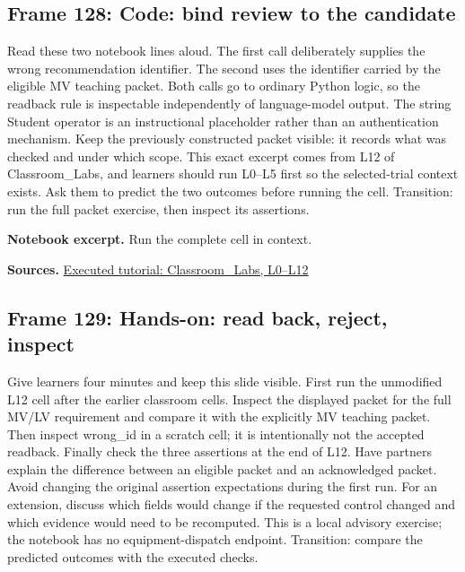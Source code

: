 \documentclass[11pt]{article}
\newcommand{\Code}[1]{}
\begin{document}
\subsection*{Frame 128: Code: bind review to the candidate}
Read these two notebook lines aloud. The first call deliberately supplies the wrong recommendation identifier. The second uses the identifier carried by the eligible MV teaching packet. Both calls go to ordinary Python logic, so the readback rule is inspectable independently of language-model output. The string Student operator is an instructional placeholder rather than an authentication mechanism. Keep the previously constructed packet visible: it records what was checked and under which scope. This exact excerpt comes from L12 of Classroom\_Labs, and learners should run L0--L5 first so the selected-trial context exists. Ask them to predict the two outcomes before running the cell. Transition: run the full packet exercise, then inspect its assertions.\par
\par\noindent\begin{minipage}{\linewidth}\textbf{Notebook excerpt.} Run the complete cell in context.\par \Code{O04.py}\end{minipage}\par
\par\nopagebreak\begin{minipage}{\linewidth}{\footnotesize\color{slate}\textbf{Sources.} \href{../Classroom_Labs.html}{Executed tutorial: Classroom\_Labs, L0--L12}\par}\end{minipage}\par\medskip
\subsection*{Frame 129: Hands-on: read back, reject, inspect}
Give learners four minutes and keep this slide visible. First run the unmodified L12 cell after the earlier classroom cells. Inspect the displayed packet for the full MV/LV requirement and compare it with the explicitly MV teaching packet. Then inspect wrong\_id in a scratch cell; it is intentionally not the accepted readback. Finally check the three assertions at the end of L12. Have partners explain the difference between an eligible packet and an acknowledged packet. Avoid changing the original assertion expectations during the first run. For an extension, discuss which fields would change if the requested control changed and which evidence would need to be recomputed. This is a local advisory exercise; the notebook has no equipment-dispatch endpoint. Transition: compare the predicted outcomes with the executed checks.\par
\end{document}
